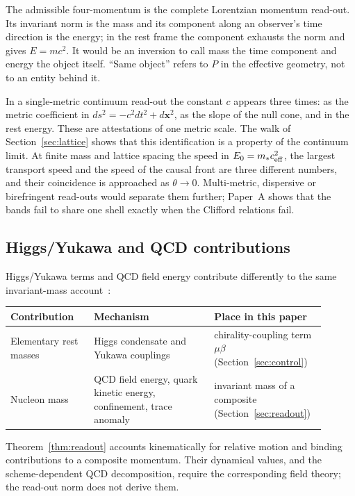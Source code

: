 \documentclass[12pt,a4paper]{article}
\theoremstyle{definition}
\theoremstyle{remark}
\begin{document}
The admissible four-momentum is the complete Lorentzian momentum read-out. Its invariant norm is the mass and its component along an observer's time direction is the energy; in the rest frame the component exhausts the norm and gives $E=mc^2$. It would be an inversion to call mass the time component and energy the object itself. ``Same object'' refers to $P$ in the effective geometry, not to an entity behind it.

In a single-metric continuum read-out the constant $c$ appears three times: as the metric coefficient in $ds^2=-c^2dt^2+d\mathbf x^2$, as the slope of the null cone, and in the rest energy. These are attestations of one metric scale. The walk of Section~\ref{sec:lattice} shows that this identification is a property of the continuum limit. At finite mass and lattice spacing the speed in $E_0=m_*c_{\rm eff}^2$, the largest transport speed and the speed of the causal front are three different numbers, and their coincidence is approached as $\theta\to0$. Multi-metric, dispersive or birefringent read-outs would separate them further; Paper~A shows that the bands fail to share one shell exactly when the Clifford relations fail.

\subsection{Higgs/Yukawa and QCD contributions}
\label{sec:physical-anchoring}

Higgs/Yukawa terms and QCD field energy contribute differently to the same invariant-mass account~\cite{Ji1995,Durr2008,Wilson1974}:

\begin{center}
\begin{tabular}{P{0.25\linewidth}P{0.36\linewidth}P{0.29\linewidth}}
\toprule
\textbf{Contribution} & \textbf{Mechanism} & \textbf{Place in this paper} \\
\midrule
Elementary rest masses & Higgs condensate and Yukawa couplings & chirality-coupling term $\mu\beta$ (Section~\ref{sec:control}) \\
Nucleon mass & QCD field energy, quark kinetic energy, confinement, trace anomaly & invariant mass of a composite (Section~\ref{sec:readout}) \\
\bottomrule
\end{tabular}
\end{center}

Theorem~\ref{thm:readout} accounts kinematically for relative motion and binding contributions to a composite momentum. Their dynamical values, and the scheme-dependent QCD decomposition, require the corresponding field theory; the read-out norm does not derive them.
\end{document}
